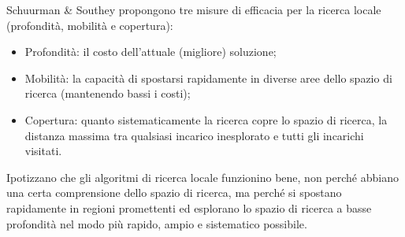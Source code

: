 Schuurman \& Southey propongono tre misure di efficacia per la ricerca locale (profondità, mobilità e copertura):
\vspace{10pt}
\begin{itemize}
    \item Profondità: il costo dell'attuale (migliore) soluzione;
    \vspace{5pt}
    \item Mobilità: la capacità di spostarsi rapidamente in diverse aree dello spazio di ricerca (mantenendo bassi i costi);
    \vspace{5pt}
    \item Copertura: quanto sistematicamente la ricerca copre lo spazio di ricerca, la distanza massima tra qualsiasi incarico inesplorato e tutti gli incarichi
    visitati.
\end{itemize}

Ipotizzano che gli algoritmi di ricerca locale funzionino bene, non perché abbiano una certa comprensione dello spazio di ricerca, ma perché si spostano 
rapidamente in regioni promettenti ed esplorano lo spazio di ricerca a basse profondità nel modo più rapido, ampio e sistematico possibile.


